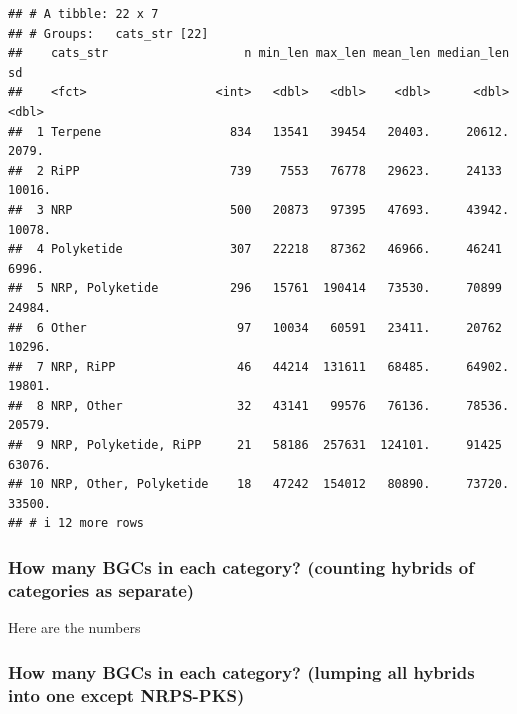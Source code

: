 \documentclass[
]{article}
\begin{document}
\begin{verbatim}
## # A tibble: 22 x 7
## # Groups:   cats_str [22]
##    cats_str                   n min_len max_len mean_len median_len     sd
##    <fct>                  <int>   <dbl>   <dbl>    <dbl>      <dbl>  <dbl>
##  1 Terpene                  834   13541   39454   20403.     20612.  2079.
##  2 RiPP                     739    7553   76778   29623.     24133  10016.
##  3 NRP                      500   20873   97395   47693.     43942. 10078.
##  4 Polyketide               307   22218   87362   46966.     46241   6996.
##  5 NRP, Polyketide          296   15761  190414   73530.     70899  24984.
##  6 Other                     97   10034   60591   23411.     20762  10296.
##  7 NRP, RiPP                 46   44214  131611   68485.     64902. 19801.
##  8 NRP, Other                32   43141   99576   76136.     78536. 20579.
##  9 NRP, Polyketide, RiPP     21   58186  257631  124101.     91425  63076.
## 10 NRP, Other, Polyketide    18   47242  154012   80890.     73720. 33500.
## # i 12 more rows
\end{verbatim}

\hypertarget{how-many-bgcs-in-each-category-counting-hybrids-of-categories-as-separate}{%
\subsubsection{How many BGCs in each category? (counting hybrids of
categories as
separate)}\label{how-many-bgcs-in-each-category-counting-hybrids-of-categories-as-separate}}

Here are the numbers

\hypertarget{how-many-bgcs-in-each-category-lumping-all-hybrids-into-one-except-nrps-pks}{%
\subsubsection{How many BGCs in each category? (lumping all hybrids into
one except
NRPS-PKS)}\label{how-many-bgcs-in-each-category-lumping-all-hybrids-into-one-except-nrps-pks}}
\end{document}
